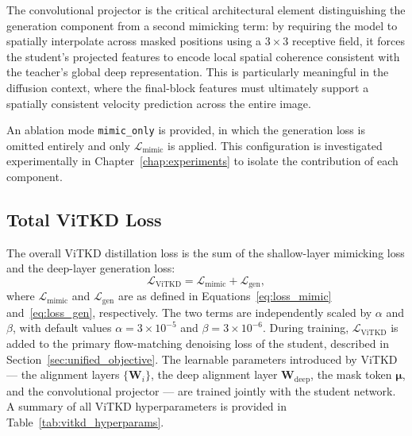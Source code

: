 The convolutional projector is the critical architectural element distinguishing the generation component from a second mimicking term: by requiring the model to spatially interpolate across masked positions using a $3 \times 3$ receptive field, it forces the student's projected features to encode local spatial coherence consistent with the teacher's global deep representation. This is particularly meaningful in the diffusion context, where the final-block features must ultimately support a spatially consistent velocity prediction across the entire image.

An ablation mode \texttt{mimic\_only} is provided, in which the generation loss is omitted entirely and only $\mathcal{L}_{\text{mimic}}$ is applied. This configuration is investigated experimentally in Chapter~\ref{chap:experiments} to isolate the contribution of each component.


\subsection*{Total ViTKD Loss}
\label{subsec:vitkd_total}

The overall ViTKD distillation loss is the sum of the shallow-layer mimicking loss and the deep-layer generation loss:
%
\begin{equation}
    \mathcal{L}_{\text{ViTKD}} = \mathcal{L}_{\text{mimic}} + \mathcal{L}_{\text{gen}},
    \label{eq:loss_vitkd}
\end{equation}
%
where $\mathcal{L}_{\text{mimic}}$ and $\mathcal{L}_{\text{gen}}$ are as defined in Equations~\eqref{eq:loss_mimic} and~\eqref{eq:loss_gen}, respectively. The two terms are independently scaled by $\alpha$ and $\beta$, with default values $\alpha = 3 \times 10^{-5}$ and $\beta = 3 \times 10^{-6}$. During training, $\mathcal{L}_{\text{ViTKD}}$ is added to the primary flow-matching denoising loss of the student, described in Section~\ref{sec:unified_objective}. The learnable parameters introduced by ViTKD — the alignment layers $\{\mathbf{W}_i\}$, the deep alignment layer $\mathbf{W}_{\text{deep}}$, the mask token $\boldsymbol{\mu}$, and the convolutional projector — are trained jointly with the student network. A summary of all ViTKD hyperparameters is provided in Table~\ref{tab:vitkd_hyperparams}.

